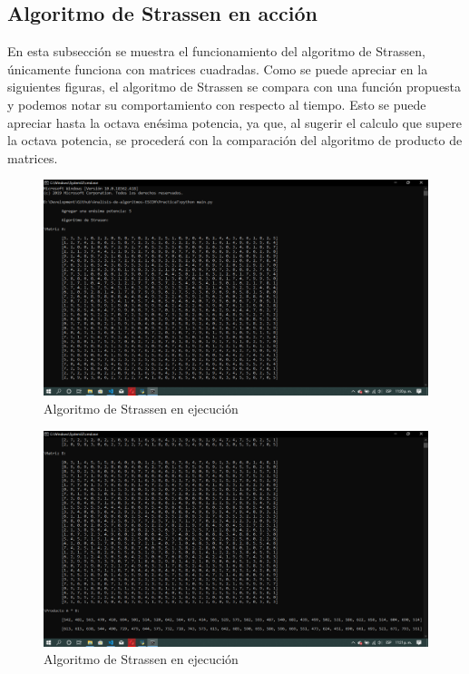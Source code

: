 \documentclass[12pt,twoside]{article}
\begin{document}
\subsection{Algoritmo de Strassen en acci\'on}
En esta subsecci\'on se muestra el funcionamiento del algoritmo de Strassen, \'unicamente funciona con matrices cuadradas. Como se puede apreciar en la siguientes figuras, el algoritmo de Strassen se compara con una función propuesta y podemos notar su comportamiento con respecto al tiempo. 
\newline \newline
Esto se puede apreciar hasta la octava en\'esima potencia, ya que, al sugerir el calculo que supere la octava potencia, se proceder\'a con la comparaci\'on del algoritmo de producto de matrices.
\begin{figure}[H]
    \centering
    \includegraphics[scale=0.35]{strassen1.png}
    \caption{Algoritmo de Strassen en ejecuci\'on}
    \label{fig:strassen_exec}
\end{figure}
\begin{figure}[H]
    \centering
    \includegraphics[scale=0.35]{strassen2.png}
    \caption{Algoritmo de Strassen en ejecuci\'on}
    \label{fig:strassen_exec}
\end{figure}
\end{document}
